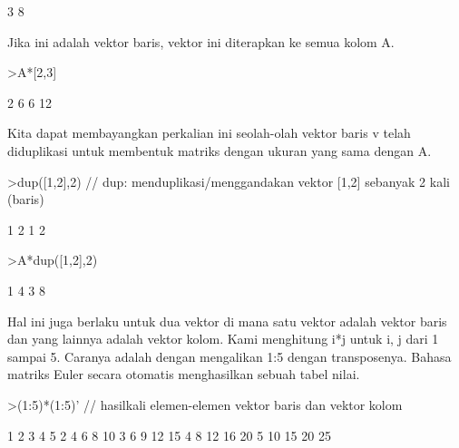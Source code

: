\documentclass[a4paper,10pt]{article}
\begin{document}
\begin{eulernotebook}
\begin{eulercomment}
\begin{eulercomment}
\begin{eulercomment}
\begin{eulercomment}
\begin{euleroutput}
              3             8 
\end{euleroutput}
\begin{eulercomment}
Jika ini adalah vektor baris, vektor ini diterapkan ke semua kolom A.
\end{eulercomment}
\begin{eulerprompt}
>A*[2,3]
\end{eulerprompt}
\begin{euleroutput}
              2             6 
              6            12 
\end{euleroutput}
\begin{eulercomment}
Kita dapat membayangkan perkalian ini seolah-olah vektor baris v telah
diduplikasi untuk membentuk matriks dengan ukuran yang sama dengan A.
\end{eulercomment}
\begin{eulerprompt}
>dup([1,2],2) // dup: menduplikasi/menggandakan vektor [1,2] sebanyak 2 kali (baris)
\end{eulerprompt}
\begin{euleroutput}
              1             2 
              1             2 
\end{euleroutput}
\begin{eulerprompt}
>A*dup([1,2],2) 
\end{eulerprompt}
\begin{euleroutput}
              1             4 
              3             8 
\end{euleroutput}
\begin{eulercomment}
Hal ini juga berlaku untuk dua vektor di mana satu vektor adalah
vektor baris dan yang lainnya adalah vektor kolom. Kami menghitung i*j
untuk i, j dari 1 sampai 5. Caranya adalah dengan mengalikan 1:5
dengan transposenya. Bahasa matriks Euler secara otomatis menghasilkan
sebuah tabel nilai.
\end{eulercomment}
\begin{eulerprompt}
>(1:5)*(1:5)' // hasilkali elemen-elemen vektor baris dan vektor kolom
\end{eulerprompt}
\begin{euleroutput}
              1             2             3             4             5 
              2             4             6             8            10 
              3             6             9            12            15 
              4             8            12            16            20 
              5            10            15            20            25 
\end{euleroutput}

\end{eulercomment}
\end{eulercomment}
\end{eulercomment}
\end{eulercomment}
\end{eulernotebook}
\end{document}
